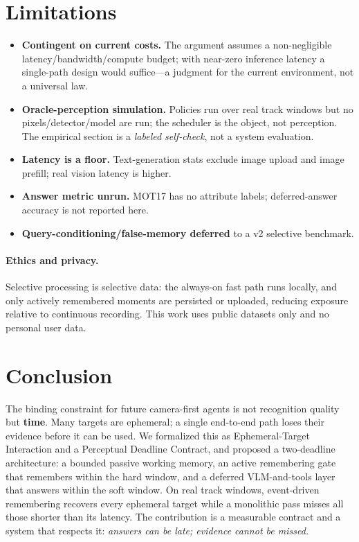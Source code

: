\documentclass[11pt,a4paper]{article}
\begin{document}
\section{Limitations}
\begin{itemize}[leftmargin=1.4em]
\item \textbf{Contingent on current costs.} The argument assumes a non-negligible latency/bandwidth/compute budget; with near-zero inference latency a single-path design would suffice---a judgment for the current environment, not a universal law.
\item \textbf{Oracle-perception simulation.} Policies run over real track windows but no pixels/detector/model are run; the scheduler is the object, not perception. The empirical section is a \emph{labeled self-check}, not a system evaluation.
\item \textbf{Latency is a floor.} Text-generation stats exclude image upload and image prefill; real vision latency is higher.
\item \textbf{Answer metric unrun.} MOT17 has no attribute labels; deferred-answer accuracy is not reported here.
\item \textbf{Query-conditioning/false-memory deferred} to a v2 selective benchmark.
\end{itemize}

\paragraph{Ethics and privacy.} Selective processing is selective data: the always-on fast path runs locally, and only actively remembered moments are persisted or uploaded, reducing exposure relative to continuous recording. This work uses public datasets only and no personal user data.

\section{Conclusion}
The binding constraint for future camera-first agents is not recognition quality but \textbf{time}. Many targets are ephemeral; a single end-to-end path loses their evidence before it can be used. We formalized this as Ephemeral-Target Interaction and a Perceptual Deadline Contract, and proposed a two-deadline architecture: a bounded passive working memory, an active remembering gate that remembers within the hard window, and a deferred VLM-and-tools layer that answers within the soft window. On real track windows, event-driven remembering recovers every ephemeral target while a monolithic pass misses all those shorter than its latency. The contribution is a measurable contract and a system that respects it: \emph{answers can be late; evidence cannot be missed.}



\end{document}
